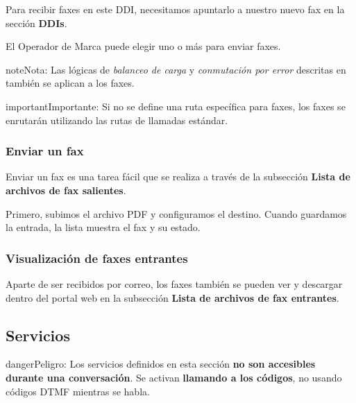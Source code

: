 \documentclass[letterpaper,10pt,spanish]{sphinxmanual}
\begin{document}
Para recibir faxes en este DDI, necesitamos apuntarlo a nuestro nuevo fax en la sección \textbf{DDIs}.

El Operador de Marca puede elegir uno o más {\hyperref[administration_portal/brand/routing/outgoing_routings:outgoing\string-routings]{}} para enviar faxes.

\begin{notice}{note}{Nota:}
Las lógicas de \emph{balanceo de carga} y \emph{conmutación por error} descritas en {\hyperref[administration_portal/brand/routing/outgoing_routings:outgoing\string-routings]{}} también se aplican a los faxes.
\end{notice}

\begin{notice}{important}{Importante:}
Si no se define una ruta específica para faxes, los faxes se enrutarán utilizando las rutas de llamadas estándar.
\end{notice}


\subsubsection{Enviar un fax}
\label{administration_portal/client/vpbx/faxes:sending-a-fax}
Enviar un fax es una tarea fácil que se realiza a través de la subsección \textbf{Lista de archivos de fax salientes}.

Primero, subimos el archivo PDF y configuramos el destino. Cuando guardamos la entrada, la lista muestra el fax y su estado.


\subsubsection{Visualización de faxes entrantes}
\label{administration_portal/client/vpbx/faxes:incoming-faxes-display}
Aparte de ser recibidos por correo, los faxes también se pueden ver y descargar dentro del portal web en la subsección \textbf{Lista de archivos de fax entrantes}.
\label{administration_portal/client/vpbx/services:client-services}

\subsection{Servicios}
\label{administration_portal/client/vpbx/services:services}\label{administration_portal/client/vpbx/services:client-services}\label{administration_portal/client/vpbx/services::doc}\label{administration_portal/client/vpbx/services:id1}
\begin{notice}{danger}{Peligro:}
Los servicios definidos en esta sección \textbf{no son accesibles durante una conversación}. Se activan \textbf{llamando a los códigos}, no usando códigos DTMF mientras se habla.
\end{notice}
\end{document}
